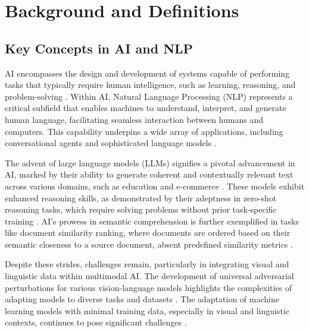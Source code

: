\section{Background and Definitions} \label{sec:Background and Definitions}



\subsection{Key Concepts in AI and NLP} \label{subsec:Key Concepts in AI and NLP}

AI encompasses the design and development of systems capable of performing tasks that typically require human intelligence, such as learning, reasoning, and problem-solving \cite{ryabko2005samplecomplexitycomputationalpattern}. Within AI, Natural Language Processing (NLP) represents a critical subfield that enables machines to understand, interpret, and generate human language, facilitating seamless interaction between humans and computers. This capability underpins a wide array of applications, including conversational agents and sophisticated language models \cite{tao2024rolecraftglmadvancingpersonalizedroleplaying}.



The advent of large language models (LLMs) signifies a pivotal advancement in AI, marked by their ability to generate coherent and contextually relevant text across various domains, such as education and e-commerce \cite{touvron2023llama}. These models exhibit enhanced reasoning skills, as demonstrated by their adeptness in zero-shot reasoning tasks, which require solving problems without prior task-specific training \cite{zheng2023layerwiserepresentationfusioncompositional}. AI's prowess in semantic comprehension is further exemplified in tasks like document similarity ranking, where documents are ordered based on their semantic closeness to a source document, absent predefined similarity metrics \cite{ginzburg2021selfsuperviseddocumentsimilarityranking}.



Despite these strides, challenges remain, particularly in integrating visual and linguistic data within multimodal AI. The development of universal adversarial perturbations for various vision-language models highlights the complexities of adapting models to diverse tasks and datasets \cite{zhang2024universaladversarialperturbationsvisionlanguage}. The adaptation of machine learning models with minimal training data, especially in visual and linguistic contexts, continues to pose significant challenges \cite{alayrac2022flamingo}.



